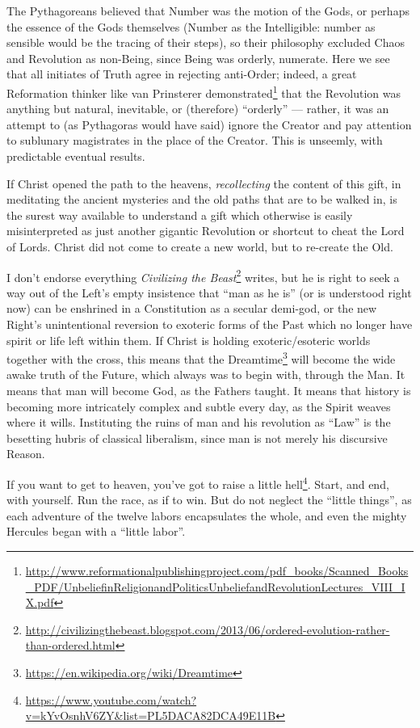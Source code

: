 The Pythagoreans believed that Number was the motion of the Gods, or perhaps the essence of the Gods themselves (Number as the Intelligible: number as sensible would be the tracing of their steps), so their philosophy excluded Chaos and Revolution as non-Being, since Being was orderly, numerate. Here we see that all initiates of Truth agree in rejecting anti-Order; indeed, a great Reformation thinker like van Prinsterer demonstrated\footnote{\url{http://www.reformationalpublishingproject.com/pdf\_books/Scanned\_Books\_PDF/UnbeliefinReligionandPoliticsUnbeliefandRevolutionLectures\_VIII\_IX.pdf}} that the Revolution was anything but natural, inevitable, or (therefore) ``orderly'' --- rather, it was an attempt to (as Pythagoras would have said) ignore the Creator and pay attention to sublunary magistrates in the place of the Creator. This is unseemly, with predictable eventual results.

If Christ opened the path to the heavens, \emph{recollecting} the content of this gift, in meditating the ancient mysteries and the old paths that are to be walked in, is the surest way available to understand a gift which otherwise is easily misinterpreted as just another gigantic Revolution or shortcut to cheat the Lord of Lords. Christ did not come to create a new world, but to re-create the Old.

I don't endorse everything \emph{Civilizing the Beast}\footnote{\url{http://civilizingthebeast.blogspot.com/2013/06/ordered-evolution-rather-than-ordered.html}} writes, but he is right to seek a way out of the Left's empty insistence that ``man as he is'' (or is understood right now) can be enshrined in a Constitution as a secular demi-god, or the new Right's unintentional reversion to exoteric forms of the Past which no longer have spirit or life left within them. If Christ is holding exoteric/esoteric worlds together with the cross, this means that the Dreamtime\footnote{\url{https://en.wikipedia.org/wiki/Dreamtime}} will become the wide awake truth of the Future, which always was to begin with, through the Man. It means that man will become God, as the Fathers taught. It means that history is becoming more intricately complex and subtle every day, as the Spirit weaves where it wills. Instituting the ruins of man and his revolution as ``Law'' is the besetting hubris of classical liberalism, since man is not merely his discursive Reason.

If you want to get to heaven, you've got to raise a little hell\footnote{\url{https://www.youtube.com/watch?v=kYvOsnhV6ZY&list=PL5DACA82DCA49E11B}}. Start, and end, with yourself. Run the race, as if to win. But do not neglect the ``little things'', as each adventure of the twelve labors encapsulates the whole, and even the mighty Hercules began with a ``little labor''.


